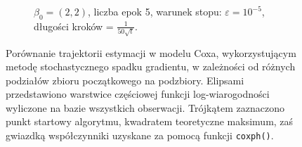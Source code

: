 \begin{figure}[hbt!]
\begin{center}
\begin{subfigure}[h!]{0.9\textwidth}
            \caption{$\beta_0=(2,2)$, liczba epok 5, warunek stopu: $\varepsilon=10^{-5}$, długości kroków = $\frac{1}{50\sqrt{t}}$.}
   \end{subfigure}  
      \end{center}
  \caption[Porównanie estymacji w modelu Coxa metodą stochastycznego spadku gradientu dla różnych podziałów zbioru początkowego na podzbiory.]{\label{rysCox2}Porównanie trajektorii estymacji w modelu Coxa, wykorzystującym metodę stochastycznego spadku gradientu, w zależności od różnych podziałów zbioru początkowego na podzbiory. Elipsami przedstawiono warstwice częściowej funkcji log-wiarogodności wyliczone na bazie wszystkich obserwacji. Trójkątem zaznaczono punkt startowy algorytmu, kwadratem teoretyczne maksimum, zaś gwiazdką współczynniki uzyskane za pomocą funkcji \texttt{coxph()}.}
\end{figure}
	
	
	
